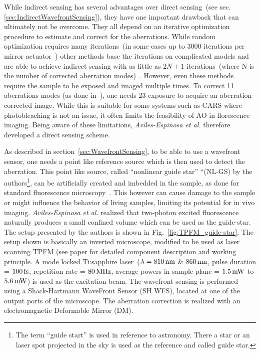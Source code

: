  While indirect sensing has several advantages over direct sensing~(see sec. \ref{sec:IndirectWavefrontSensing}), they have one important drawback that can ultimately not be overcome. They all depend on an iterative optimization procedure to estimate and correct for the aberrations. While random optimization requires many iterations~(in some cases up to 3000 iterations per mirror actuator~\cite{scan_CARS}) other methods base the iterations on complicated models and are able to achieve indirect sensing with as little as $2N+1$ iterations~(where N is the number of corrected aberration modes)~\cite{wide_AOM_loew_freq,wide_AOM_structured_illu,scan_TPFM_image_based}. However, even these methods require the sample to be exposed and imaged multiple times. To correct 11 aberrations modes (as done in~\cite{scan_TPFM_image_based}), one needs 23 exposure to acquire an aberration corrected image. While this is suitable for some systems such as CARS where photobleaching is not an issue, it often limits the feasibility of AO in florescence imaging. Being aware of these limitations, \emph{Aviles-Espinosa et al.} therefore developed a direct sensing scheme. 

As described in section~\ref{sec:WavefrontSensing}, to be able to use a wavefront sensor, one needs a point like reference source which is then used to detect the aberration. This point like source, called ``nonlinear guide star'' ``(NL-GS) by the authors\footnote{The term ``guide start'' is used in reference to astronomy. There a star or an laser spot projected in the sky is used as the reference and called guide star.}, can be artificially created and imbedded in the sample, as done for standard fluorescence microscopy~\cite{wide_fluorescence_guide_star}. This however can cause damage to the sample or might influence the behavior of living samples, limiting its potential for in vivo imaging. \emph{Aviles-Espinosa et al.} realized that two-photon excited fluorescence naturally produces a small confined volume which can be used as the guide-star. The setup presented by the authors is shown in Fig.~\ref{fig:TPFM_guide-star}. The setup shown is basically an inverted microscope, modified to be used as laser scanning TPFM (see paper for detailed component description and working principle. A mode locked Ti:sapphire laser~($\lambda = \unit[810]{nm}$ \& $\unit[860]{nm}$, pulse duration = $\unit[100]{fs}$, repetition rate = $\unit[80]{MHz}$, average powers in sample plane = $\unit[1.5]{mW}$ to $\unit[5.6]{mW}$) is used as the excitation beam. The wavefront sensing is performed using a Shack-Hartmann WaveFront Sensor (SH WFS), located at one of the output ports of the microscope. The aberration correction is realized with an electromagnetic Deformable Mirror (DM). 

